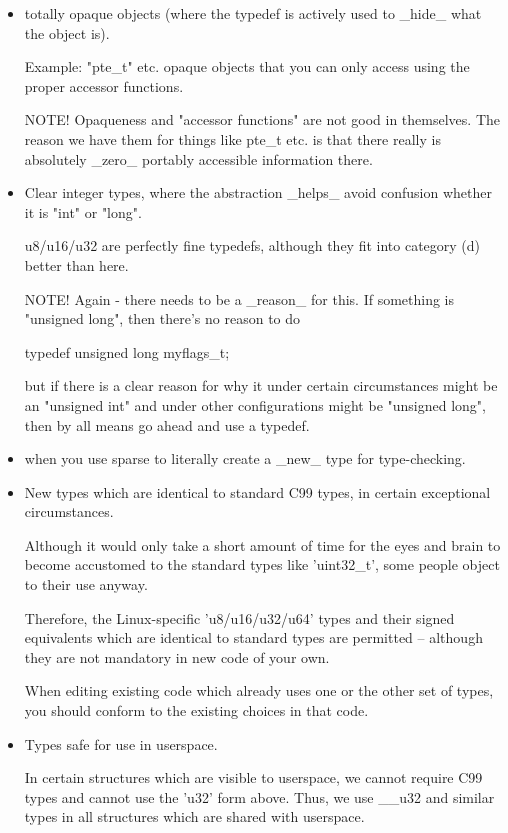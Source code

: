 \documentclass[pdftex,12pt, twocol]{article} %
\begin{document}
\begin{itemize}
\item totally opaque objects (where the typedef is actively used to \_hide\_
     what the object is).

     Example: "pte\_t" etc. opaque objects that you can only access using
     the proper accessor functions.

     NOTE! Opaqueness and "accessor functions" are not good in themselves.
     The reason we have them for things like pte\_t etc. is that there
     really is absolutely \_zero\_ portably accessible information there.

\item Clear integer types, where the abstraction \_helps\_ avoid confusion
     whether it is "int" or "long".

     u8/u16/u32 are perfectly fine typedefs, although they fit into
     category (d) better than here.

     NOTE! Again - there needs to be a \_reason\_ for this. If something is
     "unsigned long", then there's no reason to do

	typedef unsigned long myflags\_t;

     but if there is a clear reason for why it under certain circumstances
     might be an "unsigned int" and under other configurations might be
     "unsigned long", then by all means go ahead and use a typedef.

\item when you use sparse to literally create a \_new\_ type for
     type-checking.

\item New types which are identical to standard C99 types, in certain
     exceptional circumstances.

     Although it would only take a short amount of time for the eyes and
     brain to become accustomed to the standard types like 'uint32\_t',
     some people object to their use anyway.

     Therefore, the Linux-specific 'u8/u16/u32/u64' types and their
     signed equivalents which are identical to standard types are
     permitted -- although they are not mandatory in new code of your
     own.

     When editing existing code which already uses one or the other set
     of types, you should conform to the existing choices in that code.

\item Types safe for use in userspace.

     In certain structures which are visible to userspace, we cannot
     require C99 types and cannot use the 'u32' form above. Thus, we
     use \_\_u32 and similar types in all structures which are shared
     with userspace.
\end{itemize}
\end{document}
